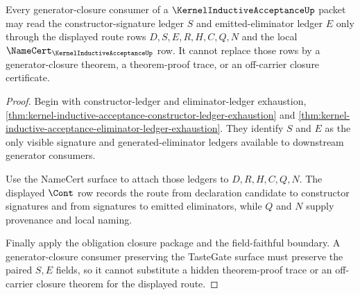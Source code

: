 \begin{theorem}
\label{thm:kernel-inductive-acceptance-generator-closure-route}
Every generator-closure consumer of a $\KernelInductiveAcceptanceUp$ packet may read the constructor-signature ledger $S$ and emitted-eliminator ledger $E$ only through the displayed route rows $D,S,E,R,H,C,Q,N$ and the local $\NameCert_{\KernelInductiveAcceptanceUp}$ row. It cannot replace those rows by a generator-closure theorem, a theorem-proof trace, or an off-carrier closure certificate.
\end{theorem}
\begin{proof}
Begin with constructor-ledger and eliminator-ledger exhaustion, \autoref{thm:kernel-inductive-acceptance-constructor-ledger-exhaustion} and \autoref{thm:kernel-inductive-acceptance-eliminator-ledger-exhaustion}. They identify $S$ and $E$ as the only visible signature and generated-eliminator ledgers available to downstream generator consumers.

Use the NameCert surface to attach those ledgers to $D,R,H,C,Q,N$. The displayed $\Cont$ row records the route from declaration candidate to constructor signatures and from signatures to emitted eliminators, while $Q$ and $N$ supply provenance and local naming.

Finally apply the obligation closure package and the field-faithful boundary. A generator-closure consumer preserving the TasteGate surface must preserve the paired $S,E$ fields, so it cannot substitute a hidden theorem-proof trace or an off-carrier closure theorem for the displayed route.
\end{proof}

